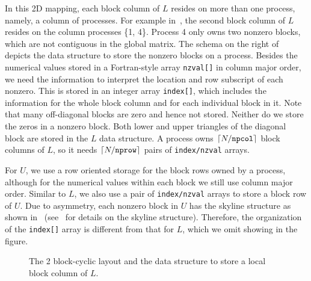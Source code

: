 In this 2D mapping, each block column of $L$ resides on more than
one process, namely, a column of processes. For example in~,
the second block column of $L$ resides on the column processes \{1, 4\}.
Process 4 only owns two nonzero blocks, which are not contiguous
in the global matrix.
The schema on the right of~ depicts the data structure
to store the nonzero blocks on a process.
Besides the numerical values stored in a Fortran-style
array {\tt nzval[]} in column major order, we need the information to
interpret the location and row subscript of each nonzero. This is stored in
an integer array {\tt index[]}, which includes the
information for the whole block column and for each individual block in it.
Note that many off-diagonal blocks are zero and hence
not stored. Neither do we store the zeros in a nonzero block.
Both lower and upper triangles of the diagonal block are stored in the
$L$ data structure.
A process owns $\lceil{N/{\tt npcol}}\rceil$ block columns of $L$, so it needs
$\lceil{N/{\tt nprow}}\rceil$ pairs of {\tt index/nzval} arrays.

For $U$, we use a row oriented storage for the block
rows owned by a process, although for the numerical values within each block
we still use column major order.  Similar to $L$, we also use a pair
of {\tt index/nzval} arrays to store a block row of $U$.
Due to asymmetry, each nonzero block in $U$ has the skyline structure
as shown in~
(see~\cite{superlu99} for details on the skyline structure).
Therefore, the organization of the {\tt index[]} array is different from
that for $L$, which we omit showing in the figure.


\begin{figure}
%
\caption{The 2 block-cyclic layout and the data structure
	to store a local block column of $L$.}
\label{fig:lu_2d}
\end{figure}


